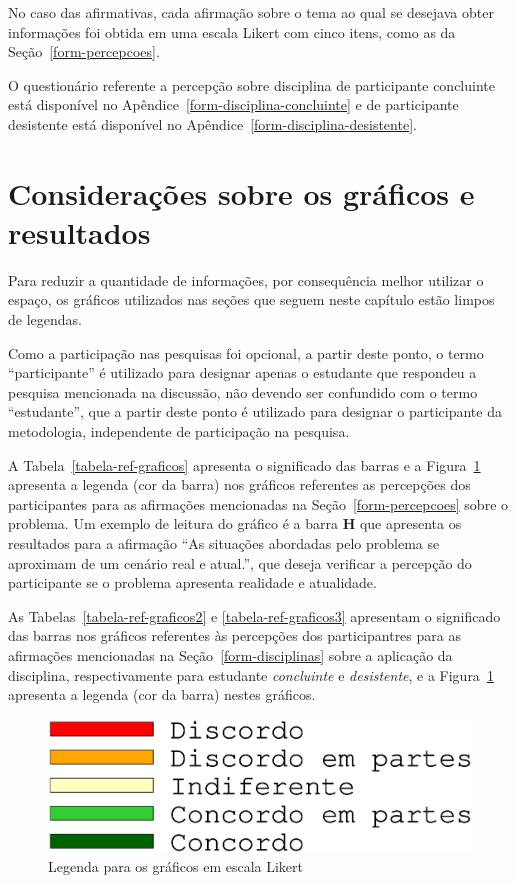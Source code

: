 No caso das afirmativas, cada afirmação sobre o tema ao qual se desejava obter informações
foi obtida em uma escala Likert com cinco itens, como as da Seção~\ref{form-percepcoes}.

O questionário referente a percepção sobre disciplina de participante
concluinte está disponível no Apêndice~\ref{form-disciplina-concluinte}
e de participante desistente está disponível no
Apêndice~\ref{form-disciplina-desistente}.

\section{Considerações sobre os gráficos e resultados}
\label{sec-ref-graficos}
Para reduzir a quantidade de informações, por consequência melhor utilizar o
espaço, os gráficos utilizados nas seções que seguem neste capítulo
estão limpos de legendas.

Como a participação nas pesquisas foi opcional, a partir deste ponto, 
o termo  ``participante'' é utilizado para designar apenas 
o estudante que respondeu a pesquisa mencionada na discussão,
não devendo ser confundido com o termo ``estudante'', que a partir deste ponto
é utilizado para designar o participante da metodologia, independente
de participação na pesquisa.

A Tabela~\ref{tabela-ref-graficos} apresenta o significado das barras
e a Figura~\ref{figura-ref-graficos} apresenta a legenda (cor da barra)
nos gráficos referentes as percepções dos participantes para as
afirmações mencionadas na Seção~\ref{form-percepcoes} sobre
o problema.
Um exemplo de leitura do gráfico é a barra \textbf{H} que apresenta
os resultados para a afirmação ``As situações abordadas pelo problema
se aproximam de um cenário real e atual.'', que deseja verificar
a percepção do participante se o problema apresenta realidade
e atualidade.



As Tabelas~\ref{tabela-ref-graficos2} e \ref{tabela-ref-graficos3} apresentam
o significado das barras nos gráficos referentes às percepções
dos participantres para as afirmações mencionadas
na Seção~\ref{form-disciplinas} sobre a aplicação da disciplina,
respectivamente para estudante \textit{concluinte} e \textit{desistente},
e a Figura~\ref{figura-ref-graficos} apresenta a legenda (cor da barra)
nestes gráficos.

\begin{figure}[!htb]
\centering
\includegraphics[scale=0.3,trim={0 4cm 0 1.5cm},clip]{figura-ref-graficos.eps}
\caption{Legenda para os gráficos em escala Likert} 
\label{figura-ref-graficos}
\end{figure}

